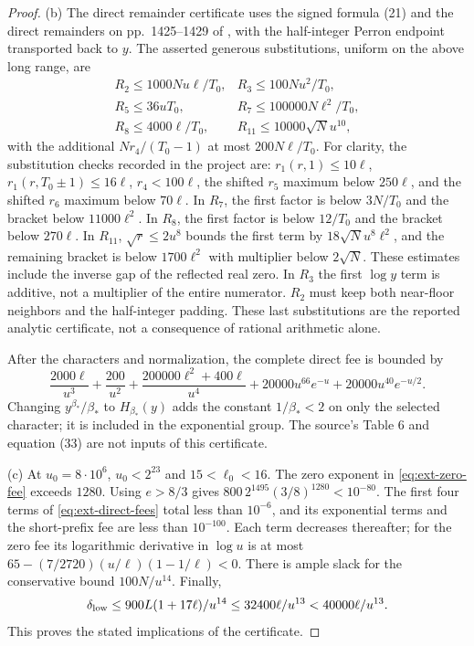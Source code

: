 \documentclass[11pt,a4paper]{article}
\theoremstyle{definition}
\theoremstyle{remark}
\begin{document}
\begin{proof}
(b) The direct remainder certificate uses the signed formula (21)
and the direct remainders on pp.~1425--1429 of \cite{Bordignon},
with the half-integer Perron endpoint transported back to $y$.
The asserted generous substitutions, uniform on the above long range,
are
\[
\begin{array}{ll}
 R_2\leq1000Nu\ell/T_0,&R_3\leq100Nu^2/T_0,\\
 R_5\leq36uT_0,&R_7\leq100000N\ell^2/T_0,\\
 R_8\leq4000\ell/T_0,&R_{11}\leq10000\sqrt N u^{10},
\end{array}
\]
with the additional $Nr_4/(T_0-1)$ at most $200N\ell/T_0$.
For clarity, the substitution checks recorded in the project are:
$r_1(r,1)\leq10\ell$, $r_1(r,T_0\pm1)\leq16\ell$,
$r_4<100\ell$, the shifted $r_5$ maximum below $250\ell$, and
the shifted $r_6$ maximum below $70\ell$. In $R_7$, the first
factor is below $3N/T_0$ and the bracket below $11000\ell^2$.
In $R_8$, the first factor is below $12/T_0$ and the bracket below
$270\ell$. In $R_{11}$, $\sqrt r\leq2u^8$ bounds the first term
by $18\sqrt N u^8\ell^2$, and the remaining bracket is below
$1700\ell^2$ with multiplier below $2\sqrt N$. These estimates
include the inverse gap of the reflected real zero. In $R_3$ the
first $\log y$ term is additive, not a multiplier of the entire
numerator. $R_2$ must keep both near-floor neighbors and the
half-integer padding. These last substitutions are the reported
analytic certificate, not a consequence of rational arithmetic alone.

After the characters and normalization, the complete direct fee is
bounded by
\begin{equation}\label{eq:ext-direct-fees}
 \frac{2000\ell}{u^3}+\frac{200}{u^2}
 +\frac{200000\ell^2+400\ell}{u^4}
 +20000u^{66}e^{-u}+20000u^{40}e^{-u/2}.
\end{equation}
Changing $y^{\beta_*}/\beta_*$ to $H_{\beta_*}(y)$ adds the constant
$1/\beta_*<2$ on only the selected character; it is included in
the exponential group. The source's Table 6 and equation (33) are
not inputs of this certificate.

(c) At $u_0=8\cdot10^6$, $u_0<2^{23}$ and $15<\ell_0<16$.
The zero exponent in \eqref{eq:ext-zero-fee} exceeds $1280$.
Using $e>8/3$ gives
$800\,2^{1495}(3/8)^{1280}<10^{-80}$.
The first four terms of \eqref{eq:ext-direct-fees} total less than
$10^{-6}$, and its exponential terms and the short-prefix fee are
less than $10^{-100}$. Each term decreases thereafter; for the zero
fee its logarithmic derivative in $\log u$ is at most
$65-(7/2720)(u/\ell)(1-1/\ell)<0$.
There is ample slack for the conservative bound $100N/u^{14}$.
Finally,
\[
 \delta_{\rm low}\leq
 900L(1+17\ell)/u^{14}
 \leq32400\ell/u^{13}<40000\ell/u^{13}.
\]
This proves the stated implications of the certificate.
\end{proof}
\end{document}
